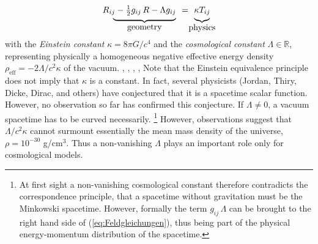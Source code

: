 \begin{equation}
	\begin{array}{r@{\ \ }c@{\ \ }l}
	R_{ij} - \frac12 g_{ij}\, R - \Lambda g_{ij} & = & \kappa T_{ij}
	\\[-1.5ex]
	\
	\schwarz{$\underbrace{\hspace*{17ex}}_{\mbox{geometry}}$}
	& &
	\hspace*{-1.5ex}
	\schwarz{$\underbrace{\hspace*{3ex}}_{\mbox{physics}}$}
	\end{array}
	\label{eq:Feldgleichungen}
\end{equation}
with the %
\emph{Einstein constant}
$\kappa = 8\pi G/c^4$ \cite[Equ. (89)]{Einstein-1914} and the \emph{cosmological constant} $\Lambda \in \mathbb{R}$, representing
physically a homogeneous negative effective energy density $\rho_{\mathrm{eff}} = - 2 \Lambda / c^2\kappa$ of the vacuum.
\cite[§111]{Landau-Lifschitz-1997},
\cite[69, 96]{Sexl-Urbantke-1987},
\cite[350]{Scheck-3-2017},
\cite[86]{Stephani-1991},
\cite[149, 151]{Straumann-1988}
Note that the Einstein equivalence principle does not imply
that $\kappa$ is a constant. In fact, several physicists (Jordan, Thiry, Dicke,
Dirac, and others) have conjectured that it is a spacetime scalar function.
However, no observation so far has conﬁrmed this conjecture. \cite[70]{Choquet-Bruhat-2023}
If $\Lambda \ne 0$, a vacuum spacetime has to be curved necessarily. \footnote{
	At first sight a non-vanishing cosmological constant therefore contradicts the correspondence principle, that a spacetime without gravitation must be the Minkowski spacetime. However, formally the term $g_{ij}\, \Lambda$ can be brought to the right hand side of (\ref{eq:Feldgleichungen}), thus being part of the physical energy-momentum distribution of the spacetime.
}
%
However, observations suggest that $\Lambda/c^2\kappa$ cannot surmount essentially the mean mass density of the universe, $\rho = 10^{-30}$ g/cm$^3$. \cite[143]{Sexl-Urbantke-1987}
Thus a non-vanishing $\Lambda$ plays an important role only for cosmological models. 

